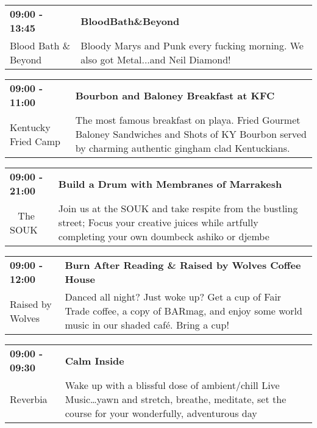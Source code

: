 \begin{tabular}{ p{1in} p{2.2in} }
    \textbf{09:00 - 13:45} & \textbf{BloodBath\&Beyond} \\
    Blood Bath \& Beyond \newline  & Bloody Marys and Punk every fucking morning. We also got Metal...and Neil Diamond! \\
    \hline 
\end{tabular}
    
\begin{tabular}{ p{1in} p{2.2in} }
    \textbf{09:00 - 11:00} & \textbf{Bourbon and Baloney Breakfast at KFC} \\
    Kentucky Fried Camp \newline  & The most famous breakfast on playa. Fried Gourmet Baloney Sandwiches and Shots of KY Bourbon served by charming authentic gingham clad Kentuckians. \\
    \hline 
\end{tabular}
    
\begin{tabular}{ p{1in} p{2.2in} }
    \textbf{09:00 - 21:00} & \textbf{Build a Drum with Membranes of Marrakesh} \\
    ~ \newline The SOUK & Join us at the SOUK and take respite from the bustling street; Focus your creative juices while artfully completing your own doumbeck ashiko or djembe \\
    \hline 
\end{tabular}
    
\begin{tabular}{ p{1in} p{2.2in} }
    \textbf{09:00 - 12:00} & \textbf{Burn After Reading \& Raised by Wolves Coffee House} \\
    Raised by Wolves \newline  & Danced all night? Just woke up? Get a cup of Fair Trade coffee, a copy of BARmag, and enjoy some world music in our shaded caf\'e. Bring a cup! \\
    \hline 
\end{tabular}
    
\begin{tabular}{ p{1in} p{2.2in} }
    \textbf{09:00 - 09:30} & \textbf{Calm Inside} \\
    Reverbia \newline  & Wake up with a blissful dose of ambient/chill Live Music\ldots yawn and stretch, breathe, meditate, set the course for your wonderfully, adventurous day \\
    \hline 
\end{tabular}
    

